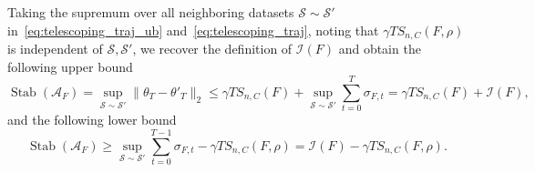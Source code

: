 \documentclass[twoside,11pt]{article}
\newcommand\mc{\mathcal}
\begin{document}
    Taking the supremum over all neighboring datasets $\mathcal{S} \sim \mathcal{S}'$ in~\eqref{eq:telescoping_traj_ub} and~\eqref{eq:telescoping_traj}, 
    noting that $\gamma T S_{n,C}(F, \rho)$ is independent of $\mathcal{S}, \mathcal{S}'$, we recover the definition of $\mathcal{I}(F)$ and obtain the following upper bound
    \begin{equation*}\label{eq:NonAff-stab}
        \operatorname{Stab}(\mc{A}_{F}) 
        = \sup_{\mathcal{S} \sim \mathcal{S}'} \| \theta_T - \theta'_T \|_2
        \leq \gamma T  S_{n, C}(F) + \sup_{\mc{S} \sim \mc{S}'} \sum_{t=0}^T \sigma_{F, t}
        = \gamma T  S_{n, C}(F) + \mathcal{I}(F),
    \end{equation*}
    and the following lower bound
    \begin{equation}\label{eq:lb-expansivity}
        \operatorname{Stab}(\mathcal{A}_F)  
        \geq \sup_{\mathcal{S} \sim \mathcal{S}'} \sum_{t=0}^{T-1} \sigma_{F,t} - \gamma T S_{n,C}(F, \rho) 
        = \mathcal{I}(F) - \gamma T S_{n,C}(F, \rho).
    \end{equation}
\end{document}
